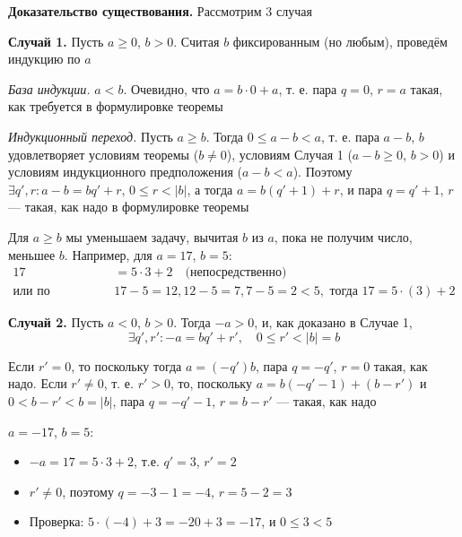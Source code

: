 \documentclass[a4paper,12pt]{article}
\theoremstyle{definition}
\theoremstyle{plain}
\theoremstyle{remark}
\begin{document}
	\noindent \textbf{Доказательство существования.}
	Рассмотрим 3 случая
	
	\textbf{Случай 1.} Пусть $a \geq 0$, $b > 0$. Считая $b$ фиксированным (но любым), проведём индукцию по $a$
	
	\textit{База индукции.} $a < b$. Очевидно, что $a = b \cdot 0 + a$, т. е. пара $q = 0$, $r = a$ такая, как требуется в формулировке теоремы
	
	\textit{Индукционный переход.} Пусть $a \geq b$. Тогда $0 \leq a-b < a$, т. е. пара $a-b$, $b$ удовлетворяет условиям теоремы ($b \neq 0$), условиям Случая 1 ($a-b \geq 0$, $b > 0$) и условиям индукционного предположения ($a-b < a$). Поэтому $\exists q', r \colon a-b = bq' + r$, $0 \leq r < |b|$, а тогда $a = b(q' + 1) + r$, и пара $q = q' + 1$, $r$ — такая, как надо в формулировке теоремы
	
	\begin{tcolorbox}[colback=blue!5, colframe=blue!40!black, title=Иллюстрация случая 1]
		Для $a \geq b$ мы уменьшаем задачу, вычитая $b$ из $a$, пока не получим число, меньшее $b$. Например, для $a=17$, $b=5$:
		\begin{align*}
			17 &= 5 \cdot 3 + 2 \quad \text{(непосредственно)}\\
			\text{или по индукции: } & 17-5=12, 12-5=7, 7-5=2 < 5, \text{ тогда } 17 = 5 \cdot (3) + 2
		\end{align*}
	\end{tcolorbox}
	
	\textbf{Случай 2.} Пусть $a < 0$, $b > 0$. Тогда $-a > 0$, и, как доказано в Случае 1,
	\[
	\exists q', r' \colon -a = bq' + r', \quad 0 \leq r' < |b| = b
	\]
	
	Если $r' = 0$, то поскольку тогда $a = (-q')b$, пара $q = -q'$, $r = 0$ такая, как надо. Если $r' \neq 0$, т. е. $r' > 0$, то, поскольку $a = b(-q' - 1) + (b - r')$ и $0 < b - r' < b = |b|$, пара $q = -q' - 1$, $r = b - r'$ — такая, как надо
	
	\begin{tcolorbox}[colback=blue!5, colframe=blue!40!black, title=Пример случая 2]
		$a = -17$, $b = 5$:
		\begin{itemize}
			\item $-a = 17 = 5 \cdot 3 + 2$, т.е. $q' = 3$, $r' = 2$
			\item $r' \neq 0$, поэтому $q = -3 - 1 = -4$, $r = 5 - 2 = 3$
			\item Проверка: $5 \cdot (-4) + 3 = -20 + 3 = -17$, и $0 \leq 3 < 5$
		\end{itemize}
	\end{tcolorbox}
	
\end{document}
